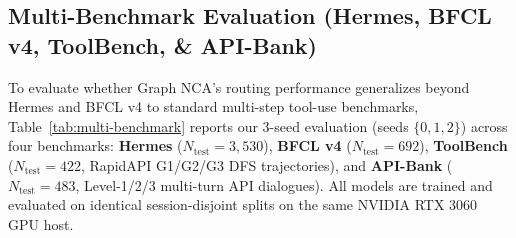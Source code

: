 \documentclass[10pt,twocolumn,letterpaper]{article}
\begin{document}
\subsection{Multi-Benchmark Evaluation (Hermes, BFCL v4, ToolBench, \& API-Bank)}
\label{sec:bfcl-controlled}

To evaluate whether Graph NCA's routing performance generalizes beyond Hermes and BFCL v4 to standard multi-step tool-use benchmarks, Table~\ref{tab:multi-benchmark} reports our 3-seed evaluation (seeds $\{0, 1, 2\}$) across four benchmarks: \textbf{Hermes} ($N_{\text{test}}=3{,}530$), \textbf{BFCL v4} ($N_{\text{test}}=692$), \textbf{ToolBench} ($N_{\text{test}}=422$, RapidAPI G1/G2/G3 DFS trajectories), and \textbf{API-Bank} ($N_{\text{test}}=483$, Level-1/2/3 multi-turn API dialogues). All models are trained and evaluated on identical session-disjoint splits on the same NVIDIA RTX 3060 GPU host.
\end{document}
